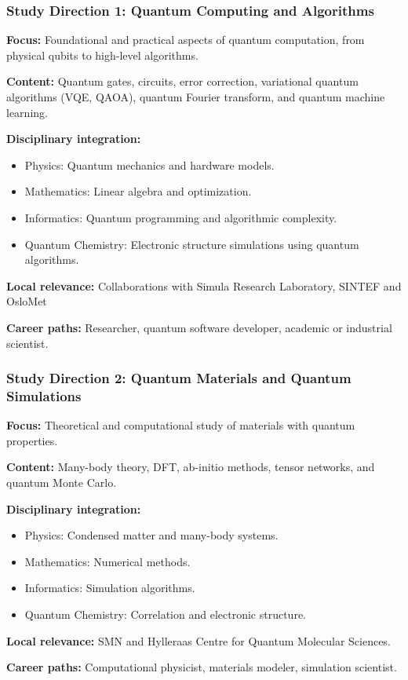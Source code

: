 \documentclass{beamer}
\begin{document}
\begin{frame}
\frametitle{Study Direction 1: Quantum Computing and Algorithms}
\textbf{Focus:} Foundational and practical aspects of quantum computation, from physical qubits to high-level algorithms.

\textbf{Content:} Quantum gates, circuits, error correction, variational quantum algorithms (VQE, QAOA), quantum Fourier transform, and quantum machine learning.

\textbf{Disciplinary integration:}
\begin{itemize}
    \item Physics: Quantum mechanics and hardware models.
    \item Mathematics: Linear algebra and optimization.
    \item Informatics: Quantum programming and algorithmic complexity.
    \item Quantum Chemistry: Electronic structure simulations using quantum algorithms.
\end{itemize}

\textbf{Local relevance:} Collaborations with Simula Research Laboratory, SINTEF and OsloMet

\textbf{Career paths:} Researcher, quantum software developer, academic or industrial scientist.

\end{frame}


\begin{frame}
\frametitle{Study Direction 2: Quantum Materials and Quantum Simulations}
\textbf{Focus:} Theoretical and computational study of materials with quantum properties.

\textbf{Content:} Many-body theory, DFT, ab-initio methods, tensor networks, and quantum Monte Carlo.

\textbf{Disciplinary integration:}
\begin{itemize}
    \item Physics: Condensed matter and many-body systems.
    \item Mathematics: Numerical methods.
    \item Informatics: Simulation algorithms.
    \item Quantum Chemistry: Correlation and electronic structure.
\end{itemize}

\textbf{Local relevance:} SMN and Hylleraas Centre for Quantum Molecular Sciences.

\textbf{Career paths:} Computational physicist, materials modeler, simulation scientist.

\end{frame}
\end{document}
